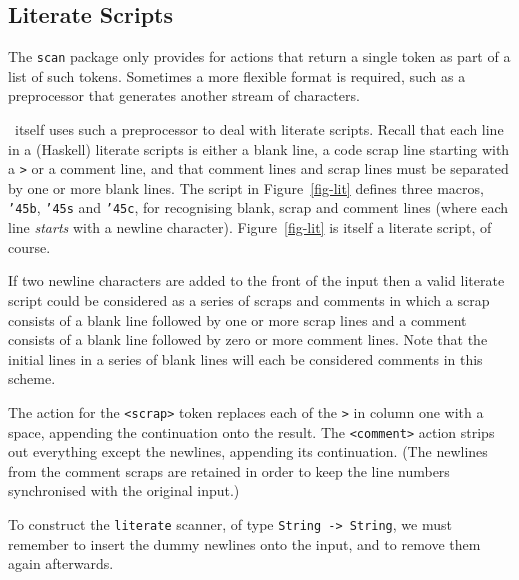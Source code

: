 \subsection{Literate Scripts}
\label{sec-literate-scripts}

The \mbox{\tt scan} package only provides for actions that return a single token as part
of a list of such tokens.  Sometimes a more flexible format is required, such
as a preprocessor that generates another stream of characters.

\lx\ itself uses such a preprocessor to deal with literate scripts.  Recall
that each line in a (Haskell) literate scripts is either a blank line, a code
scrap line starting with a \mbox{\tt >} or a comment line, and that comment lines and
scrap lines must be separated by one or more blank lines.  The script in
Figure~\ref{fig-lit} defines three macros, \mbox{\tt {\char'45}b}, \mbox{\tt {\char'45}s} and \mbox{\tt {\char'45}c}, for recognising
blank, scrap and comment lines (where each line {\em starts} with a newline
character).  Figure~\ref{fig-lit} is itself a literate script, of course.

If two newline characters are added to the front of the input then a valid
literate script could be considered as a series of scraps and comments in which
a scrap consists of a blank line followed by one or more scrap lines and a
comment consists of a blank line followed by zero or more comment lines.  Note
that the initial lines in a series of blank lines will each be considered
comments in this scheme.

The action for the \mbox{\tt <scrap>} token replaces each of the \mbox{\tt >} in column one with
a space, appending the continuation onto the result.  The \mbox{\tt <comment>} action
strips out everything except the newlines, appending its continuation. (The
newlines from the comment scraps are retained in order to keep the line numbers
synchronised with the original input.)

To construct the \mbox{\tt literate} scanner, of type \mbox{\tt String\ ->\ String}, we must
remember to insert the dummy newlines onto the input, and to remove them again
afterwards.

